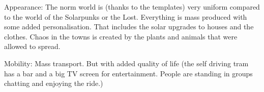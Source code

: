 Appearance: The norm world is (thanks to the templates) very uniform compared to the world of the Solarpunks or the Lost. Everything is mass produced with some added personalisation. That includes the solar upgrades to houses and the clothes.
Chaos in the towns is created by the plants and animals that were allowed to spread.

Mobility: Mass transport. But with added quality of life (the self driving tram has a bar and a big TV screen for entertainment. People are standing in groups chatting and enjoying the ride.)
